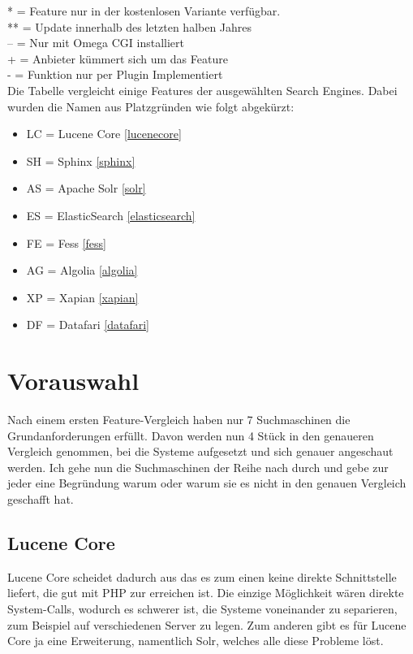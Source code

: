 \begin{table}
    *  = Feature nur in der kostenlosen Variante verfügbar. \\
    ** = Update innerhalb des letzten halben Jahres \\
    -- = Nur mit Omega CGI installiert \\
    +  = Anbieter kümmert sich um das Feature \\
    -  = Funktion nur per Plugin Implementiert \\

    Die Tabelle vergleicht einige Features der ausgewählten Search Engines. Dabei wurden die Namen aus Platzgründen wie folgt abgekürzt:

    \begin{itemize}
        \item LC = Lucene Core \ref{lucenecore}
        \item SH = Sphinx \ref{sphinx}
        \item AS = Apache Solr \ref{solr}
        \item ES = ElasticSearch \ref{elasticsearch}
        \item FE = Fess \ref{fess}
        \item AG = Algolia \ref{algolia}
        \item XP = Xapian \ref{xapian}
        \item DF = Datafari \ref{datafari}
    \end{itemize} 


\end{table}

\section{Vorauswahl}

Nach einem ersten Feature-Vergleich haben nur 7 Suchmaschinen die Grundanforderungen erfüllt. Davon werden nun 4 Stück in den genaueren Vergleich genommen, bei die Systeme aufgesetzt und sich genauer angeschaut werden. Ich gehe nun die Suchmaschinen der Reihe nach durch und gebe zur jeder eine Begründung warum oder warum sie es nicht in den genauen Vergleich geschafft hat.

\subsection{Lucene Core}

Lucene Core scheidet dadurch aus das es zum einen keine direkte Schnittstelle liefert, die gut mit PHP zur erreichen ist. Die einzige Möglichkeit wären direkte System-Calls, wodurch es schwerer ist, die Systeme voneinander zu separieren, zum Beispiel auf verschiedenen Server zu legen. Zum anderen gibt es für Lucene Core ja eine Erweiterung, namentlich Solr, welches alle diese Probleme löst. \cite{TheApacheSoftwareFoundation.2019b}

